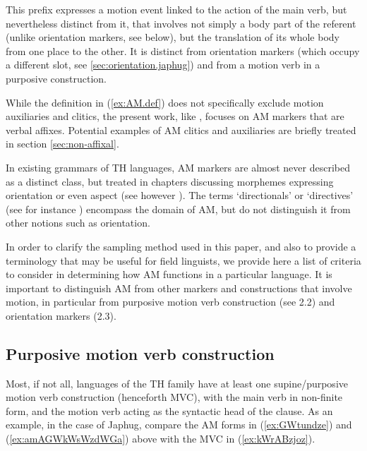 \documentclass[oneside,a4paper,11pt]{article}
\begin{document}
This prefix expresses a motion event linked to the action of the main verb, but nevertheless distinct from it, that involves not simply a body part of the referent (unlike orientation markers, see below), but the translation of its whole body from one place to the other. It is distinct from orientation markers (which occupy a different slot, see \ref{sec:orientation.japhug}) and from a motion verb in a purposive construction.

While the definition in (\ref{ex:AM.def}) does not specifically exclude motion auxiliaries and clitics, the present work, like \citet[19-20]{guillaume16am}, focuses on AM markers that are verbal affixes. Potential examples of AM clitics and auxiliaries are briefly treated in section \ref{sec:non-affixal}.


In existing grammars of TH languages, AM markers are almost never described as a distinct class, but treated in chapters discussing morphemes expressing orientation or even aspect (see however \citealt{king09dhimal}). The terms `directionals' or `directives' (see for instance \citealt{delancey85analysis}) encompass the domain of AM, but do not distinguish it from other notions such as orientation.

In order to clarify the sampling method used in this paper, and also to provide a terminology that may be useful for field linguists, we provide here a list of criteria to consider in determining how AM functions in a particular language.  It is important to distinguish AM from other markers and constructions that involve motion, in particular from purposive motion verb construction (see 2.2) and orientation markers (2.3).

\subsection{Purposive motion verb construction}
Most, if not all, languages of the TH family have at least one supine/purposive motion verb construction (henceforth MVC), with the main verb in non-finite form, and the motion verb acting as the syntactic head of the clause. As an example, in the case of Japhug, compare the AM forms in  (\ref{ex:GWtundze})  and (\ref{ex:amAGWkWsWzdWGa}) above with the MVC in (\ref{ex:kWrABzjoz}). 
\end{document}
